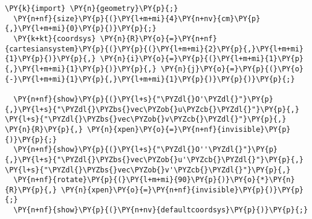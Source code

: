 \begin{Verbatim}[commandchars=\\\{\}]
  \PY{k}{import} \PY{n}{geometry}\PY{p}{;}
  \PY{n+nf}{size}\PY{p}{(}\PY{l+m+mi}{4}\PY{n+nv}{cm}\PY{p}{,}\PY{l+m+mi}{0}\PY{p}{)}\PY{p}{;}
  \PY{k+kt}{coordsys} \PY{n}{R}\PY{o}{=}\PY{n+nf}{cartesiansystem}\PY{p}{(}\PY{p}{(}\PY{l+m+mi}{2}\PY{p}{,}\PY{l+m+mi}{1}\PY{p}{)}\PY{p}{,} \PY{n}{i}\PY{o}{=}\PY{p}{(}\PY{l+m+mi}{1}\PY{p}{,}\PY{l+m+mi}{1}\PY{p}{)}\PY{p}{,} \PY{n}{j}\PY{o}{=}\PY{p}{(}\PY{o}{-}\PY{l+m+mi}{1}\PY{p}{,}\PY{l+m+mi}{1}\PY{p}{)}\PY{p}{)}\PY{p}{;}

  \PY{n+nf}{show}\PY{p}{(}\PY{l+s}{"\PYZdl{}O'\PYZdl{}"}\PY{p}{,}\PY{l+s}{"\PYZdl{}\PYZbs{}vec\PYZob{}u\PYZcb{}\PYZdl{}"}\PY{p}{,} \PY{l+s}{"\PYZdl{}\PYZbs{}vec\PYZob{}v\PYZcb{}\PYZdl{}"}\PY{p}{,} \PY{n}{R}\PY{p}{,} \PY{n}{xpen}\PY{o}{=}\PY{n+nf}{invisible}\PY{p}{)}\PY{p}{;}
  \PY{n+nf}{show}\PY{p}{(}\PY{l+s}{"\PYZdl{}O''\PYZdl{}"}\PY{p}{,}\PY{l+s}{"\PYZdl{}\PYZbs{}vec\PYZob{}u'\PYZcb{}\PYZdl{}"}\PY{p}{,} \PY{l+s}{"\PYZdl{}\PYZbs{}vec\PYZob{}v'\PYZcb{}\PYZdl{}"}\PY{p}{,}
  \PY{n+nf}{rotate}\PY{p}{(}\PY{l+m+mi}{90}\PY{p}{)}\PY{o}{*}\PY{n}{R}\PY{p}{,} \PY{n}{xpen}\PY{o}{=}\PY{n+nf}{invisible}\PY{p}{)}\PY{p}{;}
  \PY{n+nf}{show}\PY{p}{(}\PY{n+nv}{defaultcoordsys}\PY{p}{)}\PY{p}{;}
\end{Verbatim}
